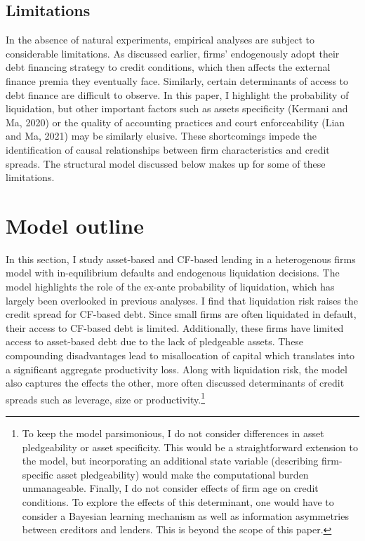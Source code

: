 \documentclass[12pt]{article}
\begin{document}
\subsection{Limitations}
In the absence of natural experiments, empirical analyses are subject to considerable limitations. As discussed earlier, firms' endogenously adopt their debt financing strategy to credit conditions, which then affects the external finance premia they eventually face. Similarly, certain determinants of access to debt finance are difficult to observe. In this paper, I highlight the probability of liquidation, but other important factors such as assets specificity (Kermani and Ma, 2020) or the quality of accounting practices and court enforceability (Lian and Ma, 2021) may be similarly elusive. These shortcomings impede the identification of causal relationships between firm characteristics and credit spreads. The structural model discussed below makes up for some of these limitations. 


\section{Model outline} \label{sec:model}
In this section, I study asset-based and CF-based lending in a heterogenous firms model with in-equilibrium defaults and endogenous liquidation decisions. The model highlights the role of the ex-ante probability of liquidation, which has largely been overlooked in previous analyses. I find that liquidation risk raises the credit spread for CF-based debt. Since small firms are often liquidated in default, their access to CF-based debt is limited. Additionally, these firms have limited access to asset-based debt due to the lack of pledgeable assets. These compounding disadvantages lead to misallocation of capital which translates into a significant aggregate productivity loss. Along with liquidation risk, the model also captures the effects the other, more often discussed determinants of credit spreads such as leverage, size or productivity.\footnote{To keep the model parsimonious, I do not consider differences in asset pledgeability or asset specificity. This would be a straightforward extension to the model, but incorporating an additional state variable (describing firm-specific asset pledgeability) would make the computational burden unmanageable. Finally, I do not consider effects of firm age on credit conditions. To explore the effects of this determinant, one would have to consider a Bayesian learning mechanism as well as information asymmetries between creditors and lenders. This is beyond the scope of this paper.}
\end{document}
